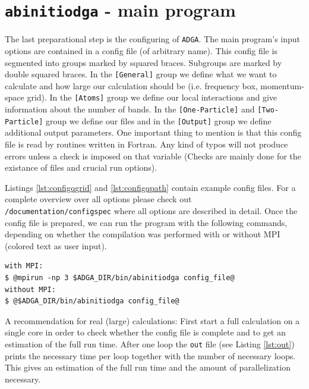 \documentclass[a4paper,11pt]{article}
\numberwithin{equation}{section} %
\begin{document}
\newpage
\section{\protect\Verb+abinitiodga+ - main program}
The last preparational step is the configuring of \verb+ADGA+. The main program's input options are contained in a config file (of arbitrary name). This config file is segmented into groups marked by squared braces. Subgroups are marked by double squared braces. In the {\color{red} \verb|[General]|} group we define what we want to calculate and how large our calculation should be (i.e. frequency box, momentum-space grid). In the {\color{red} \verb|[Atoms]|} group we define our local interactions and give information about the number of bands. In the {\color{red} \verb|[One-Particle]|} and {\color{red} \verb|[Two-Particle]|} group we define our files and in the {\color{red} \verb|[Output]|} group we define additional output parameters. One important thing to mention is that this config file is read by routines written in Fortran. Any kind of typos will not produce errors unless a check is imposed on that variable (Checks are mainly done for the existance of files and crucial run options).


Listings \ref{lst:configqgrid} and \ref{lst:configqpath} contain example config files.
For a complete overview over all options please check out \\
{\color{blue}\verb|/documentation/configspec|} where all options are described in detail. Once the config file is prepared, we can run the program with the following commands, depending on whether the compilation was performed with or without MPI (colored text as user input).

\begin{lstlisting}[caption=abinitiodga run commands, frame=single, basicstyle=\small, style=base]
with MPI:
$ @mpirun -np 3 $ADGA_DIR/bin/abinitiodga config_file@
without MPI:
$ @$ADGA_DIR/bin/abinitiodga config_file@
\end{lstlisting}

A recommendation for real (large) calculations: First start a full calculation on a single core
in order to check whether the config file is complete and to get an estimation of the full run time.
After one loop the \verb+out+ file (see Listing \ref{lst:out}) prints the necessary time per loop together with the number of necessary loops. This gives an estimation of the full run time and the amount of parallelization necessary.
\end{document}
